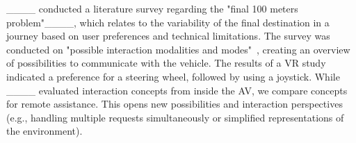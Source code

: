 ____ conducted a literature survey regarding the "final 100 meters problem"____, which relates to the variability of the final destination in a journey based on user preferences and technical limitations. The survey was conducted on "possible interaction modalities and modes"~\cite[p. 2]{colley_systematic_2022}, creating an overview of possibilities to communicate with the vehicle. %
The results of a VR study indicated a preference for a steering wheel, followed by using a joystick. %
While ____ evaluated interaction concepts from inside the AV, we compare concepts for remote assistance. This opens new possibilities and interaction perspectives (e.g., handling multiple requests simultaneously or simplified representations of the environment).





